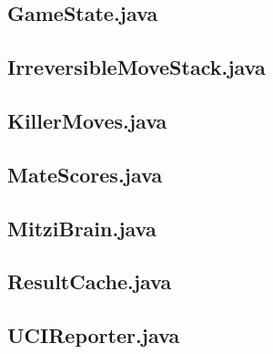 \documentclass [12pt ,a4paper, english]{scrartcl}
\theoremstyle{plain}
\theoremstyle{definition}
\theoremstyle{remark}
\begin{document}
\subsection{GameState.java}


\subsection{IrreversibleMoveStack.java}


\subsection{KillerMoves.java}


\subsection{MateScores.java}


\subsection{MitziBrain.java}
\label{sec:mitzibrain}


\subsection{ResultCache.java}


\subsection{UCIReporter.java}

\end{document}
